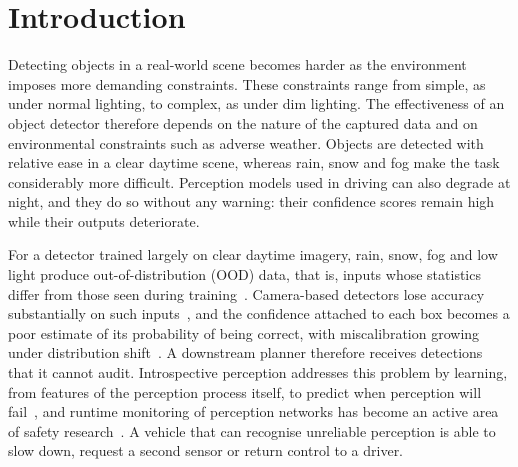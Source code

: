 \documentclass[pdflatex,sn-mathphys-num]{sn-jnl}
\begin{document}

\maketitle

\section{Introduction}\label{sec:intro}

Detecting objects in a real-world scene becomes harder as the environment imposes more demanding constraints. These constraints range from simple, as under normal lighting, to complex, as under dim lighting. The effectiveness of an object detector therefore depends on the nature of the captured data and on environmental constraints such as adverse weather. Objects are detected with relative ease in a clear daytime scene, whereas rain, snow and fog make the task considerably more difficult. Perception models used in driving can also degrade at night, and they do so without any warning: their confidence scores remain high while their outputs deteriorate.

For a detector trained largely on clear daytime imagery, rain, snow, fog and low light produce out-of-distribution (OOD) data, that is, inputs whose statistics differ from those seen during training~\cite{hendrycks2017baseline,ovadia2019trust,yang2024oodsurvey}. Camera-based detectors lose accuracy substantially on such inputs~\cite{michaelis2019winter,bijelic2020seeing,zhang2023adverse}, and the confidence attached to each box becomes a poor estimate of its probability of being correct, with miscalibration growing under distribution shift~\cite{guo2017calibration,ovadia2019trust}. A downstream planner therefore receives detections that it cannot audit. Introspective perception addresses this problem by learning, from features of the perception process itself, to predict when perception will fail~\cite{daftry2016introspective,rabiee2019ivoa,rabiee2023introspective}, and runtime monitoring of perception networks has become an active area of safety research~\cite{schotschneider2025runtime}. A vehicle that can recognise unreliable perception is able to slow down, request a second sensor or return control to a driver.
\end{document}
